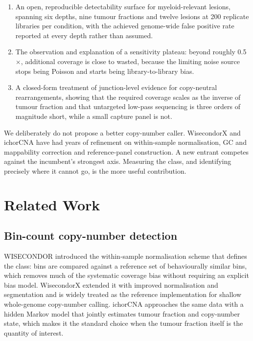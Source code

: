 \documentclass[conference]{IEEEtran}
\begin{document}
\begin{enumerate}
\item An open, reproducible detectability surface for myeloid-relevant lesions,
      spanning six depths, nine tumour fractions and twelve lesions at 200
      replicate libraries per condition, with the achieved genome-wide false
      positive rate reported at every depth rather than assumed.
\item The observation and explanation of a sensitivity plateau: beyond roughly
      0.5$\times$, additional coverage is close to wasted, because the limiting
      noise source stops being Poisson and starts being library-to-library
      bias.
\item A closed-form treatment of junction-level evidence for copy-neutral
      rearrangements, showing that the required coverage scales as the inverse
      of tumour fraction and that untargeted low-pass sequencing is three
      orders of magnitude short, while a small capture panel is not.
\end{enumerate}

We deliberately do not propose a better copy-number caller. WisecondorX and
ichorCNA have had years of refinement on within-sample normalisation, GC and
mappability correction and reference-panel construction. A new entrant competes
against the incumbent's strongest axis. Measuring the class, and identifying
precisely where it cannot go, is the more useful contribution.

\section{Related Work}

\subsection{Bin-count copy-number detection}

WISECONDOR \cite{straver2014wisecondor} introduced the within-sample
normalisation scheme that defines the class: bins are compared against a
reference set of behaviourally similar bins, which removes much of the
systematic coverage bias without requiring an explicit bias model.
WisecondorX \cite{raman2019wisecondorx} extended it with improved
normalisation and segmentation and is widely treated as the reference
implementation for shallow whole-genome copy-number calling. ichorCNA
\cite{adalsteinsson2017ichorcna} approaches the same data with a hidden Markov
model that jointly estimates tumour fraction and copy-number state, which makes
it the standard choice when the tumour fraction itself is the quantity of
interest.
\end{document}
